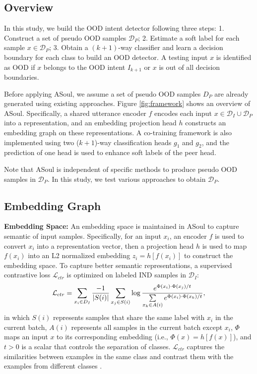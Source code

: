 \documentclass[11pt]{article}
\begin{document}
\subsection{Overview}\label{sec:overview}
In this study, we build the OOD intent detector following three steps: 1. Construct a set of pseudo OOD samples $\mathcal{D}_P$; 2. Estimate a soft label for each sample $x \in \mathcal{D}_P$; 3. Obtain a $(k+1)$-way classifier and learn a decision boundary for each class to build an OOD detector. A testing input $x$ is identified as OOD if $x$ belongs to the OOD intent $I_{k+1}$ or $x$ is out of all decision boundaries.

Before applying ASoul, we assume a set of pseudo OOD samples $D_P$ are already generated using existing approaches. Figure \ref{fig:framework} shows an overview of ASoul. Specifically, a shared utterance encoder $f$ encodes each input $x \in \mathcal{D}_I \cup \mathcal{D}_P$ into a representation, and an embedding projection head $h$ constructs an embedding graph on these representations. A co-training framework is also implemented using two ($k+1$)-way classification heads $g_1$ and $g_2$, and the prediction of one head is used to enhance soft labels of the peer head.

Note that ASoul is independent of specific methods to produce pseudo OOD samples in $\mathcal{D}_P$. In this study, we test various approaches to obtain $\mathcal{D}_P$.

\subsection{Embedding Graph}

\textbf{Embedding Space:} 
An embedding space is maintained in ASoul to capture semantic of input samples. Specifically, for an input $x_i$, an encoder $f$ is used to convert $x_i$ into a representation vector, then a projection head $h$ is used to map $f(x_i)$ into an L2 normalized embedding $z_i = h[f(x_i)]$ to construct the embedding space. To capture better semantic representations, a supervised contrastive loss \citep{khosla2020supervised,gunel2020supervised} $\mathcal{L}_{ctr}$ is optimized on labeled IND samples in $\mathcal{D}_{I}$:
\begin{equation}\small
\mathcal{L}_{ctr}=\sum_{x_i \in D_I} \frac{-1}{|S(i)|} \sum_{x_j\in S(i)} \log\frac{e^{\Phi(x_i) \cdot \Phi(x_j)/t}}{\sum\limits_{x_k\in A(i)} e^{\Phi(x_i) \cdot \Phi(x_k)/t}},
\end{equation}
in which $S(i)$ represents samples that share the same label with $x_i$ in the current batch, $A(i)$ represents all samples in the current batch except $x_i$, $\Phi$ maps an input $x$ to its corresponding embedding (i.e., $\Phi(x) = h[f(x)]$), and $t > 0$ is a scalar that controls the separation of classes. $\mathcal{L}_{ctr}$ captures the similarities between examples in the same class and contrast them with the examples from different classes \cite{gunel2020supervised}.
\end{document}
